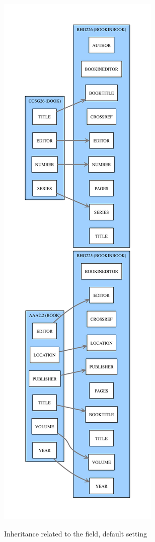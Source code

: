 \documentclass{ltxdockit}[2011/03/25]
\begin{document}
\begin{figure}
  \centering
  \includegraphics[height=0.99\textheight]{example-bookineditor.pdf}
  \label{example-bookineditor}
  \caption{Inheritance related to the  field, default setting}
\end{figure}
\end{document}
